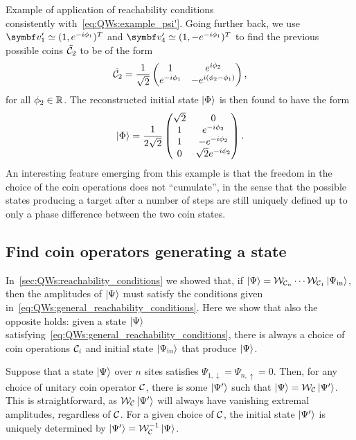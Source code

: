 \begin{examplebox}[label=ex:QWs:conditions_few_steps]{Example of application of reachability conditions}
\begin{equation}
    \end{equation}
    consistently with~\cref{eq:QWs:example_psi'}.
    Going further back, we use $\bs v_1'\simeq(1,e^{-i\phi_1})^T$ and $\bs v_4'\simeq(1,-e^{-i\phi_1})^T$ to find the previous possible coins $\tilde{{\mathcal{C}}}_2$ to be of the form
    \begin{equation}
        \tilde{{\mathcal{C}}}_2 = \frac{1}{\sqrt2} \begin{pmatrix}
            1 & e^{i\phi_2} \\
            e^{-i\phi_1} & -e^{i(\phi_2-\phi_1)}
        \end{pmatrix},
    \end{equation}
    for all $\phi_2\in{\mathbb{R}}$. The reconstructed initial state $\ket\Phi$ is then found to have the form
    \begin{equation}
        \ket\Phi = \frac{1}{2\sqrt2}
        \begin{pmatrix}
            \sqrt2 & 0 \\
            1 & e^{-i\phi_2} \\
            1 & -e^{-i\phi_2} \\
            0 & \sqrt2 e^{-i\phi_2}
        \end{pmatrix}.
    \end{equation}
    An interesting feature emerging from this example is that the freedom in the choice of the coin operations does not ``cumulate'', in the sense that the possible states producing a target after a number of steps are still uniquely defined up to only a phase difference between the two coin states.
\end{examplebox}

\subsection{Find coin operators generating a state}
\label{sec:QWs:coin_operators_generating_state}

In~\cref{sec:QWs:reachability_conditions} we showed that, if $\ket\Psi={\mathcal{W}}_{{\mathcal{C}}_n}\cdots{\mathcal{W}}_{{\mathcal{C}}_1}\ket{\Psi_{\operatorname{in}}}$, then the amplitudes of $\ket\Psi$ must satisfy the conditions given in~\cref{eq:QWs:general_reachability_conditions}.
Here we show that also the opposite holds: given a state $\ket\Psi$ satisfying~\cref{eq:QWs:general_reachability_conditions}, there is always a choice of coin operations ${\mathcal{C}}_i$ and initial state $\ket{\Psi_{\operatorname{in}}}$ that produce $\ket\Psi$.

Suppose that a state $\ket\Psi$ over $n$ sites satisfies $\Psi_{1,\downarrow}=\Psi_{n,\uparrow}=0$. Then, for any choice of unitary coin operator ${\mathcal{C}}$, there is some $\ket{\Psi'}$ such that $\ket\Psi={\mathcal{W}}_{\mathcal{C}}\ket{\Psi'}$.
This is straightforward, as ${\mathcal{W}}_{\mathcal{C}}\ket{\Psi'}$ will always have vanishing extremal amplitudes, regardless of ${\mathcal{C}}$. For a given choice of ${\mathcal{C}}$, the initial state $\ket{\Psi'}$ is uniquely determined by $\ket{\Psi'}={\mathcal{W}}_{\mathcal{C}}^{-1}\ket\Psi$.

